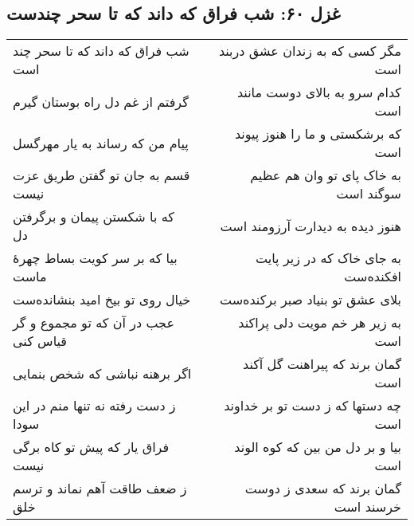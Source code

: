 \begin{center}
\section*{غزل ۶۰: شب فراق که داند که تا سحر چندست}
\label{sec:060}
\begin{longtable}{l p{0.5cm} r}
شب فراق که داند که تا سحر چند است
&&
مگر کسی که به زندان عشق دربند است
\\
گرفتم از غم دل راه بوستان گیرم
&&
کدام سرو به بالای دوست مانند است
\\
پیام من که رساند به یار مهرگسل
&&
که برشکستی و ما را هنوز پیوند است
\\
قسم به جان تو گفتن طریق عزت نیست
&&
به خاک پای تو وان هم عظیم سوگند است
\\
که با شکستن پیمان و برگرفتن دل
&&
هنوز دیده به دیدارت آرزومند است
\\
بیا که بر سر کویت بساط چهرهٔ ماست
&&
به جای خاک که در زیر پایت افکنده‌ست
\\
خیال روی تو بیخ امید بنشانده‌ست
&&
بلای عشق تو بنیاد صبر برکنده‌ست
\\
عجب در آن که تو مجموع و گر قیاس کنی
&&
به زیر هر خم مویت دلی پراکند است
\\
اگر برهنه نباشی که شخص بنمایی
&&
گمان برند که پیراهنت گل آکند است
\\
ز دست رفته نه تنها منم در این سودا
&&
چه دستها که ز دست تو بر خداوند است
\\
فراق یار که پیش تو کاه برگی نیست
&&
بیا و بر دل من بین که کوه الوند است
\\
ز ضعف طاقت آهم نماند و ترسم خلق
&&
گمان برند که سعدی ز دوست خرسند است
\\
\end{longtable}
\end{center}
